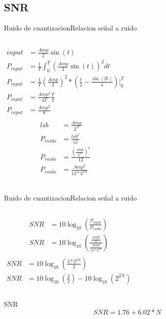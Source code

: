    \subsection{SNR}
   \begin{frame}{Ruido de cuantizacion}{Relacion señal a ruido}
      \begin{columns}[onlytextwidth]
         \begin{align*}
         input&=\frac{Amp}{2}\sin(t) \\
         P_{input} &= \frac{1}{T} \int^T_0 \left(\frac{Amp}{2}\sin(t)\right)^2 dt \\
         P_{input} &= \frac{1}{T} \left(\frac{Amp}{2}\right)^2* \left( \frac{t}{2}-\frac{\sin(2t)}{4}\right)\Big\rvert^T_0 \\
         P_{input} &= \frac{Amp^2}{4T} \frac{T}{2}\\
         P_{input} &= \frac{Amp^2}{8} \\
      \end{align*}
         \begin{align*}
            lsb       &= \frac{Amp}{2^N} \\
            P_{ruido} &= \frac{lsb^2}{12}\\
            P_{ruido} &= \frac{\left(\frac{Amp}{2^N}\right)^2}{12}\\
            P_{ruido} &= \frac{Amp^2}{12*2^{2N}}\\
         \end{align*}
      \end{columns}
      \vfill
   \end{frame}
\begin{frame}{Ruido de cuantizacion}{Relacion señal a ruido}
   \begin{columns}[onlytextwidth]
      \begin{align*}
         SNR&=10 \log_{10} \left(\frac{P_{input}}{P_{ruido}} \right)\\
         SNR&=10 \log_{10}\left(\frac{\frac{Amp^2}{8}}{\frac{Amp^2}{12*2^{2N}}} \right) \\
      \end{align*}
      \begin{align*}
         SNR&=10 \log_{10}\left(\frac{3*2^{2N}}{2} \right)\\
         SNR&=10\log_{10}\left(\frac{3}{2}\right)-10\log_{10}\left(2^{2N}\right)
      \end{align*}
   \end{columns}
   \begin{block}{SNR}
      \begin{equation}
         SNR = 1.76 + 6.02 * N
      \end{equation}
   \end{block}
   \begin{centering}
       \\
       \\
   \end{centering}
\end{frame}
